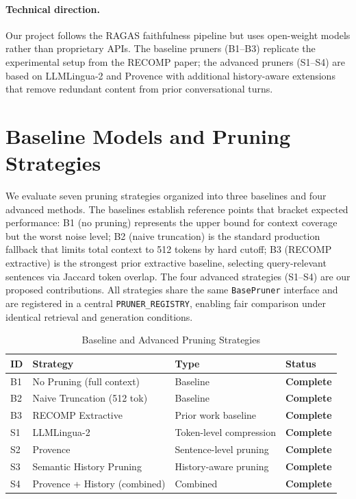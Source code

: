 \documentclass[11pt,a4paper]{article}
\begin{document}
\paragraph{Technical direction.}
Our project follows the RAGAS faithfulness pipeline but uses open-weight models rather than proprietary APIs. The baseline pruners (B1--B3) replicate the experimental setup from the RECOMP paper; the advanced pruners (S1--S4) are based on LLMLingua-2 and Provence with additional history-aware extensions that remove redundant content from prior conversational turns.

\section{Baseline Models and Pruning Strategies}

We evaluate seven pruning strategies organized into three baselines and four advanced methods. The baselines establish reference points that bracket expected performance: B1 (no pruning) represents the upper bound for context coverage but the worst noise level; B2 (naive truncation) is the standard production fallback that limits total context to 512 tokens by hard cutoff; B3 (RECOMP extractive) is the strongest prior extractive baseline, selecting query-relevant sentences via Jaccard token overlap. The four advanced strategies (S1--S4) are our proposed contributions. All strategies share the same \texttt{BasePruner} interface and are registered in a central \texttt{PRUNER\_REGISTRY}, enabling fair comparison under identical retrieval and generation conditions.

\begin{table}[H]
\centering
\caption{Baseline and Advanced Pruning Strategies}
\begin{tabular}{llll}
\toprule
\textbf{ID} & \textbf{Strategy} & \textbf{Type} & \textbf{Status} \\
\midrule
B1 & No Pruning (full context) & Baseline & \textbf{Complete} \\
B2 & Naive Truncation (512 tok) & Baseline & \textbf{Complete} \\
B3 & RECOMP Extractive & Prior work baseline & \textbf{Complete} \\
S1 & LLMLingua-2 & Token-level compression & \textbf{Complete} \\
S2 & Provence & Sentence-level pruning & \textbf{Complete} \\
S3 & Semantic History Pruning & History-aware pruning & \textbf{Complete} \\
S4 & Provence + History (combined) & Combined & \textbf{Complete} \\
\bottomrule
\end{tabular}
\end{table}
\end{document}
